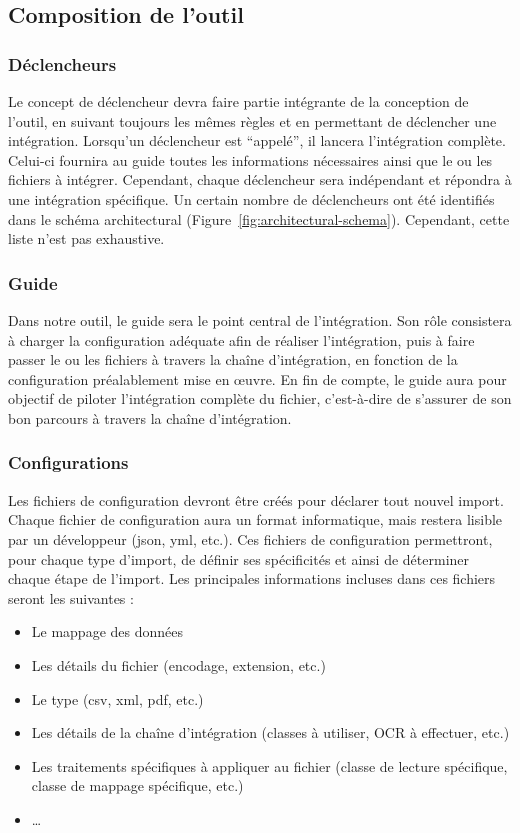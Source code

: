 \subsection{Composition de l'outil}

\subsubsection{Déclencheurs}

Le concept de déclencheur devra faire partie intégrante de la conception de l'outil, en suivant toujours les mêmes règles et en permettant de déclencher une intégration. Lorsqu'un déclencheur est \foreignquote{french}{appelé}, il lancera l'intégration complète. Celui-ci fournira au guide toutes les informations nécessaires ainsi que le ou les fichiers à intégrer. Cependant, chaque déclencheur sera indépendant et répondra à une intégration spécifique. Un certain nombre de déclencheurs ont été identifiés dans le schéma architectural (Figure~\ref{fig:architectural-schema}). Cependant, cette liste n'est pas exhaustive.

\subsubsection{Guide}

Dans notre outil, le guide sera le point central de l'intégration. Son rôle consistera à charger la configuration adéquate afin de réaliser l'intégration, puis à faire passer le ou les fichiers à travers la chaîne d'intégration, en fonction de la configuration préalablement mise en œuvre. En fin de compte, le guide aura pour objectif de piloter l'intégration complète du fichier, c'est-à-dire de s'assurer de son bon parcours à travers la chaîne d'intégration.


\subsubsection{Configurations}

Les fichiers de configuration devront être créés pour déclarer tout nouvel import. Chaque fichier de configuration aura un format informatique, mais restera lisible par un développeur (json, yml, etc.). Ces fichiers de configuration permettront, pour chaque type d'import, de définir ses spécificités et ainsi de déterminer chaque étape de l'import. Les principales informations incluses dans ces fichiers seront les suivantes :

\begin{itemize}
    \item Le mappage des données
    \item Les détails du fichier (encodage, extension, etc.)
    \item Le type (csv, xml, pdf, etc.)
    \item Les détails de la chaîne d'intégration (classes à utiliser, OCR à effectuer, etc.)
    \item Les traitements spécifiques à appliquer au fichier (classe de lecture spécifique, classe de mappage spécifique, etc.)
    \item \dots
\end{itemize}


